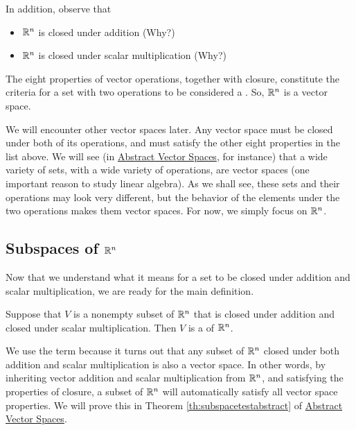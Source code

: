\documentclass{ximera}
\begin{document}
  In addition, observe that  
  \begin{itemize}
      \item[]  $\mathbb{R}^n$ is closed under addition (Why?)
      \item[] $\mathbb{R}^n$ is closed under scalar multiplication (Why?)
\end{itemize}      
      The eight properties of vector operations, together with closure, constitute the criteria for a set with two operations to be considered a . So, $\mathbb{R}^n$ is a vector space.  
      
      We will encounter other vector spaces later. Any vector space must be closed under both of its operations, and must satisfy the other eight properties in the list above.  We will see (in \href{\xmbaseurl/VSP-0050/main}{Abstract Vector Spaces}, for instance) that a wide variety of sets, with a wide variety of operations, are vector spaces (one important reason to study linear algebra).  As we shall see, these sets and their operations may look very different, but the behavior of the elements under the two operations makes them vector spaces.  For now, we simply focus on $\mathbb{R}^n$.


\subsection*{Subspaces of $\mathbb{R}^n$}

Now that we understand what it means for a set to be closed under addition and scalar multiplication, we are ready for the main definition.

\begin{definition}\label{def:subspace} Suppose that $V$ is a nonempty subset of $\mathbb{R}^n$ that is closed under addition and closed under scalar multiplication.  Then $V$ is a  of $\mathbb{R}^n$.
\end{definition}
We use the term  because it turns out that any subset of $\mathbb{R}^n$ closed under both addition and scalar multiplication is also a vector space.  In other words, by inheriting vector addition and scalar multiplication from $\mathbb{R}^n$, and satisfying the properties of closure, a subset of $\mathbb{R}^n$ will automatically satisfy all vector space properties.  We will prove this in Theorem \ref{th:subspacetestabstract} of \href{\xmbaseurl/VSP-0050/main}{Abstract Vector Spaces}.
\end{document}
